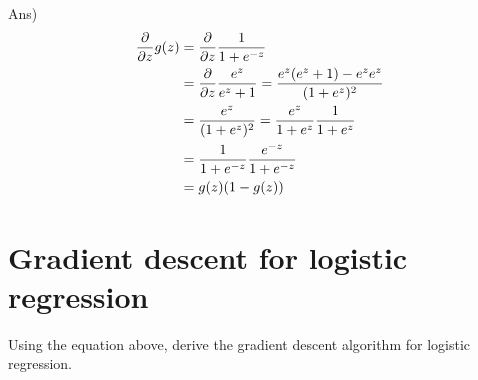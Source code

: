 \documentclass[12pt]{article}%
\begin{document}
Ans) 
\begin{equation}
	\begin{aligned}
		{\partial \over {\partial z}} g(z) & = {\partial \over {\partial z}} {1 \over {1 + e^{-z}}}\\
		& = {\partial \over {\partial z}} {e^z \over {e^z + 1}} = {{e^z (e^z + 1) - e^z e^z} \over {(1 +e^z )^2}}\\
		& = {e^z \over {(1 +e^z )^2}} = {e^z \over {1 +e^z }} {1 \over {1 +e^z }}\\
		& = {1 \over {1 +e^{-z} }} {e^{-z} \over {1 +e^{-z} }} \\
		& = g(z) (1 - g(z))
	\end{aligned}
\end{equation}

\section{Gradient descent for logistic regression}
Using the equation above, derive the gradient descent algorithm for logistic regression.\\
\end{document}
